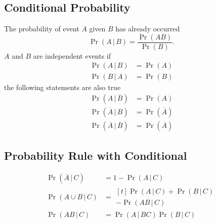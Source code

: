 \documentclass{article}
\begin{document}
\begin{multicols}{3}
    \subsection{Conditional Probability}
    The probability of event \(A\) given \(B\) has already occurred
    \begin{equation*}
        \Pr{\left( A \,\vert\, B \right)} = \frac{\Pr{\left( A B \right)}}{\Pr{\left( B \right)}}.
    \end{equation*}
    \(A\) and \(B\) are independent events if
    \begin{align*}
        \Pr{\left( A \,\vert\, B \right)} & = \Pr{\left( A \right)} \\
        \Pr{\left( B \,\vert\, A \right)} & = \Pr{\left( B \right)}
    \end{align*}
    the following statements are also true
    \begin{align*}
        \Pr{\left( A \,\vert\, \overline{B} \right)}            & = \Pr{\left( A \right)}            \\
        \Pr{\left( \overline{A} \,\vert\, B \right)}            & = \Pr{\left( \overline{A} \right)} \\
        \Pr{\left( \overline{A} \,\vert\, \overline{B} \right)} & = \Pr{\left( \overline{A} \right)}
    \end{align*}
    \subsection{Probability Rule with Conditional}
    \begin{align*}
        \Pr{\left( \overline{A} \,\vert\, C \right)} & = 1 - \Pr{\left( A \,\vert\, C \right)}                                                 \\
        \Pr{\left( A \cup B \,\vert\, C \right)}     & =
                                                         \begin{aligned}[t]
                                                             \Pr{\left( A \,\vert\, C \right)} + \Pr{\left( B \,\vert\, C \right)} \\
                                                             - \Pr{\left( AB \,\vert\, C \right)}
                                                         \end{aligned}
        \\
        \Pr{\left( A B \,\vert\, C \right)}          & = \Pr{\left( A \,\vert\, BC \right)} \Pr{\left( B \,\vert\, C \right)}
    \end{align*}

\end{multicols}
\end{document}

